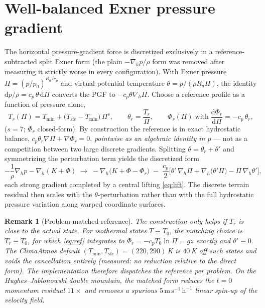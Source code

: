 \documentclass[11pt]{article}
\newcommand{\dd}{\mathrm{d}}
\newcommand{\Rd}{R_d}
\newcommand{\cp}{c_p}
\newtheorem{rem}{Remark}
\begin{document}
\section{Well-balanced Exner pressure gradient}
\label{sec:exner}

The horizontal pressure-gradient force is discretized exclusively in a
reference-subtracted split Exner form (the plain $-\nabla_h p/\rho$ form
was removed after measuring it strictly worse in every configuration).
With Exner pressure $\Pi = (p/p_0)^{\Rd/\cp}$ and virtual potential
temperature $\theta = p/(\rho \Rd \Pi)$, the identity
$\dd p/\rho = \cp\,\theta\,\dd\Pi$ converts the PGF to
$-\cp\theta\nabla_h\Pi$. Choose a reference profile as a function of
pressure alone,
\begin{equation}
T_r(\Pi) = T_{\min} + \big(T_{\mathrm{sfc}} - T_{\min}\big)\,\Pi^{s},
\qquad
\theta_r = \frac{T_r}{\Pi},
\qquad
\Phi_r(\Pi) \;\text{with}\;
\frac{\dd \Phi_r}{\dd \Pi} = -\cp\,\theta_r,
\label{eq:ref}
\end{equation}
($s = 7$; $\Phi_r$ closed-form). By construction the reference is in
exact hydrostatic balance, $\cp\theta_r\nabla\Pi + \nabla\Phi_r = 0$,
\emph{pointwise as an algebraic identity in $p$} --- not as a competition
between two large discrete gradients. Splitting
$\theta = \theta_r + \theta'$ and symmetrizing the perturbation term
yields the discretized form
\begin{equation}
-\frac{1}{\rho}\nabla_h p - \nabla_h(K+\Phi)
\;\longrightarrow\;
-\nabla_h\big(K + \Phi - \Phi_r\big)
\;-\;\frac{\cp}{2}\Big[\theta'\,\nabla_h\Pi
 + \nabla_h\big(\theta'\Pi\big) - \Pi\,\nabla_h\theta'\Big],
\label{eq:exner}
\end{equation}
each strong gradient completed by a central lifting \eqref{eq:lift}. The
discrete terrain residual then scales with the $\theta$-perturbation
rather than with the full hydrostatic pressure variation along warped
coordinate surfaces.

\begin{rem}[Problem-matched reference]
The construction only helps if $T_r$ is close to the actual state. For
isothermal states $T \equiv T_0$, the matching choice is $T_r \equiv
T_0$, for which \eqref{eq:ref} integrates to $\Phi_r = -\cp T_0 \ln\Pi =
gz$ exactly and $\theta' \equiv 0$. The ClimaAtmos default $(T_{\min},
T_{\mathrm{sfc}}) = (220, 290)\,$K is $40\,$K off such states and voids
the cancellation entirely (measured: no reduction relative to the direct
form). The implementation therefore dispatches the reference per problem.
On the Hughes--Jablonowski double mountain, the matched form reduces the
$t=0$ momentum residual $11\times$ and removes a spurious
$5\,\mathrm{m\,s^{-1}\,h^{-1}}$ linear spin-up of the velocity field.
\end{rem}
\end{document}
